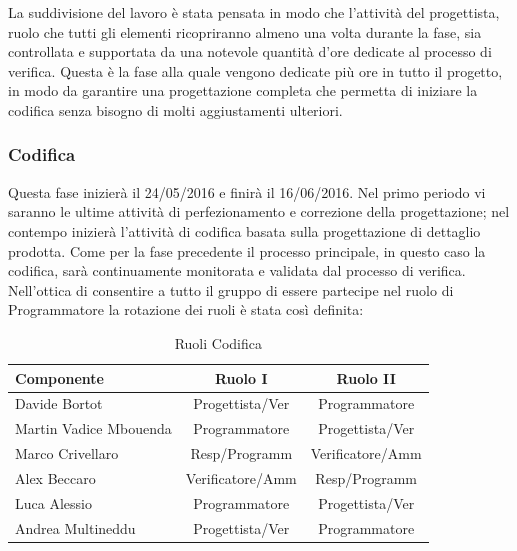\documentclass[a4paper,11pt]{article}
\begin{document}
		La suddivisione del lavoro è stata pensata in modo che l'attività del progettista, ruolo che tutti gli elementi ricopriranno almeno una volta durante la fase, sia controllata e supportata da una notevole quantità d'ore dedicate al processo di verifica. Questa è la fase alla quale vengono dedicate più ore in tutto il progetto, in modo da garantire una progettazione completa che permetta di iniziare la codifica senza bisogno di molti aggiustamenti ulteriori.
		\newpage
		\subsubsection{Codifica}
		Questa fase inizierà il 24/05/2016 e finirà il 16/06/2016. Nel primo periodo vi saranno le ultime attività di perfezionamento e correzione della progettazione; nel contempo inizierà l'attività di codifica basata sulla progettazione di dettaglio prodotta. Come per la fase precedente il processo principale, in questo caso la codifica, sarà continuamente monitorata e validata dal processo di verifica. Nell'ottica di consentire a tutto il gruppo di essere partecipe nel ruolo di Programmatore la rotazione dei ruoli è stata così definita:
		\begin{table}[h!]			
		\begin{center}
			\begin{tabular}{l c c}
			\textbf{Componente} & \textbf{Ruolo I} & \textbf{Ruolo II} \\
			\midrule
			Davide Bortot & Progettista/Ver & Programmatore\\
			Martin Vadice Mbouenda & Programmatore & Progettista/Ver\\
			Marco Crivellaro & Resp/Programm & Verificatore/Amm\\
			Alex Beccaro & Verificatore/Amm & Resp/Programm\\
			Luca Alessio & Programmatore  & Progettista/Ver\\
			Andrea Multineddu & Progettista/Ver & Programmatore\\
			\midrule
			\end{tabular}
		\end{center}
		\caption{Ruoli Codifica}
		\end{table}
		
\end{document}
